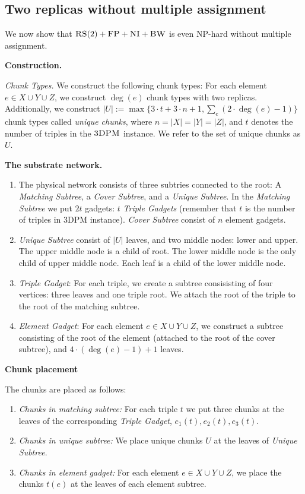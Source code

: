 \documentclass[preprint,12pt]{elsarticle}
\newcommand{\CC}{\textsc{NI}}
\newcommand{\FP}{\textsc{FP}}
\newcommand{\RS}{\textsc{RS}}
\newcommand{\BW}{\textsc{BW}}
\newcommand{\TDPM}{\textsc{3DPM}}
\newcommand{\UnqSubtree}{{{\emph{Unique Subtree}}}}
\newcommand{\MatchSubtree}{{\emph{Matching Subtree}}}
\newcommand{\CoverSubtree}{{\emph{Cover Subtree}}}
\newcommand{\TripleGadget}{{\emph{Triple Gadget}}}
\newcommand{\TripleGadgets}{{\emph{Triple Gadgets}}}
\newcommand{\ElGadget}{{\emph{Element Gadget}}}
\begin{document}
\subsection{Two replicas without multiple assignment}

We now show that $\RS(2)+\FP+\CC+\BW$ is even NP-hard without multiple
assignment.

\noindent \textbf{Construction.}

\emph{Chunk Types.}  We construct the following chunk types: For each
element $e\in X\cup Y\cup Z$, we construct $\deg(e)$ chunk types with
two replicas. Additionally, we construct $|U| := \max\{3\cdot t + 3\cdot n + 1, \sum_e(2\cdot \deg(e)-1)\}$
chunk types called \emph{unique chunks}, where $n = |X| = |Y| = |Z|$, and $t$ denotes the number of triples in the $\TDPM$ instance. We refer to the set of unique chunks as $U$.

\noindent \textbf{The substrate network.}

\begin{enumerate}
  \item The physical network consists of three subtries connected to the root: A {\MatchSubtree},
  a {\CoverSubtree}, and a {\UnqSubtree}. In the {\MatchSubtree} we put $2t$ gadgets:
  $t$ {\TripleGadgets} (remember that $t$ is the
  number of triples in {\TDPM} instance). {\CoverSubtree} consist of
  $n$ element gadgets.
  \item {\UnqSubtree} consist of $|U|$ leaves, and two middle nodes: lower and upper. The upper middle node is a child of root. The lower middle node is the only child of upper middle node. Each leaf is a child of the lower middle node.
  \item \TripleGadget: For each triple, we create a subtree
  consisisting of four vertices: three leaves and one triple root.  We
  attach the root of the triple to the root of the matching subtree.
  \item \ElGadget: For each element $e \in X\cup Y\cup Z$, we
  construct a subtree consisting of the root of the element (attached
  to the root of the cover subtree), and $4\cdot(\deg(e)-1)+1$ leaves.
\end{enumerate}

\noindent \textbf{Chunk placement}

The chunks are placed as follows:
\begin{enumerate}
  \item \emph{Chunks in matching subtree:} For each triple $t$ we put
  three chunks at the leaves of the corresponding \TripleGadget,
  $e_1(t), e_2(t), e_3(t)$.
  \item \emph{Chunks in unique subtree:} We place unique chunks $U$
  at the leaves of {\UnqSubtree}.
  \item \emph{Chunks in element gadget:} For each element
  $e\in X\cup Y\cup Z$, we place the chunks $t(e)$ at the
  leaves of each element subtree.
\end{enumerate}
\end{document}
